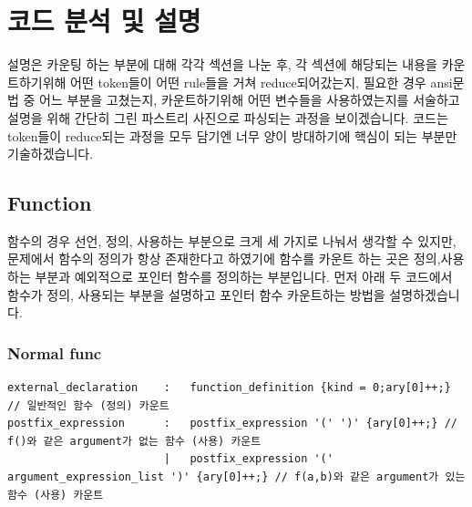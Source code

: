 \documentclass{article}
\begin{document}
\section{코드 분석 및 설명}
    설명은 카운팅 하는 부분에 대해 각각 섹션을 나눈 후, 각 섹션에 해당되는 내용을 카운트하기위해 어떤 token들이 어떤 rule들을 거쳐 reduce되어갔는지,
    필요한 경우 ansi문법 중 어느 부분을 고쳤는지, 카운트하기위해 어떤 변수들을 사용하였는지를 서술하고 설명을 위해 간단히 그린 파스트리 사진으로 
    파싱되는 과정을 보이겠습니다.
    코드는 token들이 reduce되는 과정을 모두 담기엔 너무 양이 방대하기에 핵심이 되는 부분만 기술하겠습니다.
        \subsection{Function}
        함수의 경우 선언, 정의, 사용하는 부분으로 크게 세 가지로 나눠서 생각할 수 있지만, 문제에서 함수의 정의가 항상 존재한다고 하였기에
        함수를 카운트 하는 곳은 정의,사용하는 부분과 예외적으로 포인터 함수를 정의하는 부분입니다. 
        먼저 아래 두 코드에서 함수가 정의, 사용되는 부분을 설명하고 포인터 함수 카운트하는 방법을 설명하겠습니다.\\
        \subsubsection{Normal func}
\begin{verbatim}
external_declaration    :   function_definition {kind = 0;ary[0]++;} // 일반적인 함수 (정의) 카운트 
postfix_expression      :   postfix_expression '(' ')' {ary[0]++;} // f()와 같은 argument가 없는 함수 (사용) 카운트
                        |   postfix_expression '(' argument_expression_list ')' {ary[0]++;} // f(a,b)와 같은 argument가 있는 함수 (사용) 카운트
\end{verbatim}
\end{document}
